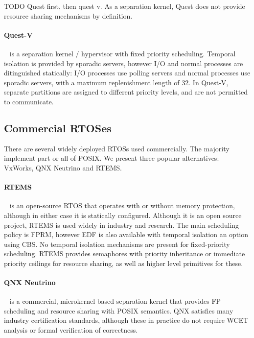 TODO Quest first, then quest v. 
As a separation kernel, Quest does not provide resource sharing mechanisms by definition. 

\paragraph{Quest-V}~\citep{Danish_LW_11} is a separation kernel / hypervisor with fixed priority scheduling.
Temporal isolation is provided by sporadic servers, however I/O and normal processes are
ditinguished statically: I/O processes use polling servers and normal processes use sporadic
servers, with a maximum replenishment length of 32. In Quest-V, separate partitions are assigned to
different priority levels, and are not permitted to communicate. 

\subsection{Commercial RTOSes}
There are several widely deployed \glspl{RTOS} used commercially.  The majority implement part or
all of \gls{POSIX}.  We present three popular alternatives: VxWorks, QNX Neutrino and RTEMS.

\paragraph{RTEMS}~\citep{RTEMS:URL} is an open-source \gls{RTOS} that operates with or without
memory protection, although in either case it is statically configured.  Although it is an open
source project, RTEMS is used widely in industry and research.  The main scheduling policy is
\gls{FPRM}, however \gls{EDF} is also available with temporal isolation an option using \gls{CBS}.
No temporal isolation mechanisms are present for fixed-priority scheduling.  RTEMS provides
semaphores with priority inheritance or immediate priority ceilings for resource sharing, as well as
higher level primitives for these. 

\paragraph{QNX Neutrino}~\citep{QNX_10} is a commercial, microkernel-based separation kernel that provides
\gls{FP} scheduling and resource sharing with POSIX semantics.  QNX satisfies many industry
certification standards, although these in practice do not require {\gls{WCET}} analysis or formal
verification of correctness.

